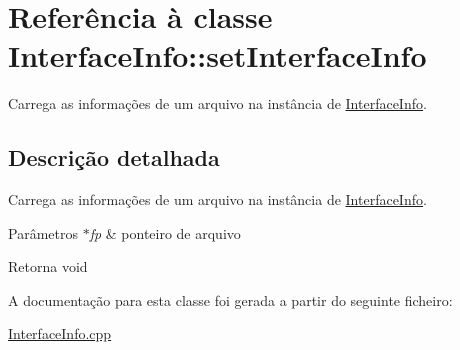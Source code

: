 \hypertarget{class_interface_info_1_1set_interface_info}{}\section{Referência à classe Interface\+Info\+:\+:set\+Interface\+Info}
\label{class_interface_info_1_1set_interface_info}


Carrega as informações de um arquivo na instância de \hyperlink{class_interface_info}{Interface\+Info}.  




\subsection{Descrição detalhada}
Carrega as informações de um arquivo na instância de \hyperlink{class_interface_info}{Interface\+Info}. 


\begin{DoxyParams}{Parâmetros}
{\em $\ast$fp} & ponteiro de arquivo \\
\hline
\end{DoxyParams}
\begin{DoxyReturn}{Retorna}
void 
\end{DoxyReturn}


A documentação para esta classe foi gerada a partir do seguinte ficheiro\+:\begin{DoxyCompactItemize}
\item 
\hyperlink{_interface_info_8cpp}{Interface\+Info.\+cpp}\end{DoxyCompactItemize}
